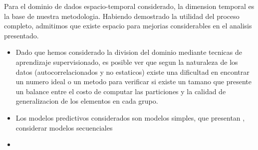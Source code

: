 Para el dominio de dados espacio-temporal considerado, la dimension temporal es la base de nuestra metodologia. Habiendo demostrado la utilidad del proceso completo, admitimos que existe espacio para mejorias considerables en el analisis presentado. 
\begin{itemize}
	\item Dado que hemos considerado la division del dominio mediante tecnicas de aprendizaje supervisionado, es posible ver que segun la naturaleza de los datos (autocorrelacionados y no estaticos) existe una dificultad en encontrar un numero ideal o un metodo para verificar si existe un tamano que presente un balance entre el costo de computar las particiones y la calidad de generalizacion de los elementos en cada grupo. 
	
	\item Los modelos predictivos considerados son modelos simples, que presentan , considerar modelos secuenciales 
	
	\item 
\end{itemize}
